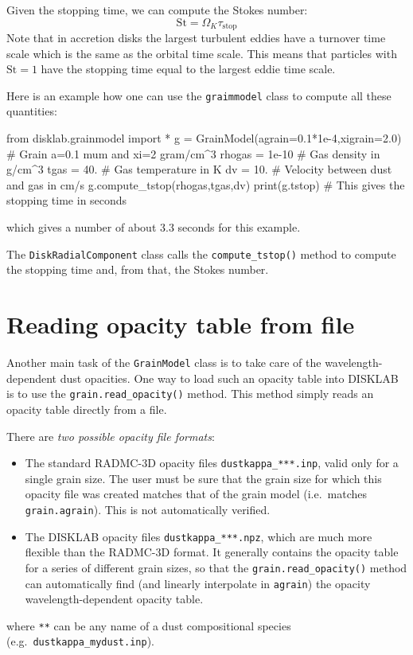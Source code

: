 \documentclass{book}
\newcommand{\code}[1]{{\small\tt #1}}
\begin{document}
Given the stopping time, we can compute the Stokes number:
\begin{equation}\label{eq-define-stokes-number}
\mathrm{St} = \Omega_K\tau_{\mathrm{stop}}
\end{equation}
Note that in accretion disks the largest turbulent eddies have a turnover time scale
which is the same as the orbital time scale. This means that particles with $\mathrm{St}=1$
have the stopping time equal to the largest eddie time scale.

Here is an example how one can use the \code{graimmodel} class to compute
all these quantities:
\begin{codebox}
from disklab.grainmodel import *
g = GrainModel(agrain=0.1*1e-4,xigrain=2.0)  # Grain a=0.1 mum and xi=2 gram/cm^3
rhogas = 1e-10        # Gas density in g/cm^3
tgas   = 40.          # Gas temperature in K
dv     = 10.          # Velocity between dust and gas in cm/s
g.compute_tstop(rhogas,tgas,dv)
print(g.tstop)        # This gives the stopping time in seconds
\end{codebox}
which gives a number of about 3.3 seconds for this example.

The \code{DiskRadialComponent} class calls the \code{compute\_tstop()} method to compute
the stopping time and, from that, the Stokes number.

\section{Reading opacity table from file}
\label{sec-reading-opacity-file}
%
Another main task of the \code{GrainModel} class is to take care of the
wavelength-dependent dust opacities. One way to load such an opacity table
into {\sf DISKLAB} is to use the \code{grain.read\_opacity()} method. This
method simply reads an opacity table directly from a file.

There are {\em two possible opacity file formats}:
\begin{itemize}
\item The standard {\sf RADMC-3D} opacity files
  \code{dustkappa\_***.inp}, valid only for a single
  grain size. The user must be sure that the grain size
  for which this opacity file was created matches that of
  the grain model (i.e.\ matches \code{grain.agrain}). This
  is not automatically verified.
\item The {\sf DISKLAB} opacity files \code{dustkappa\_***.npz},
  which are much more flexible than the {\sf RADMC-3D} format.
  It generally contains the opacity table for a series of different
  grain sizes, so that the \code{grain.read\_opacity()} method can
  automatically find (and linearly interpolate in \code{agrain})
  the opacity wavelength-dependent opacity table.
\end{itemize}
where \code{***} can be any name of a dust compositional species
(e.g.~\code{dustkappa\_mydust.inp}).
\end{document}
